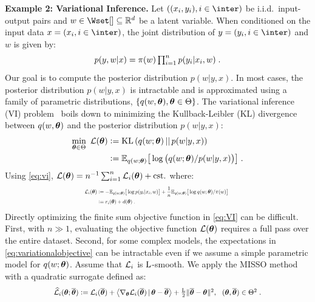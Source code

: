 \documentclass{article}
\newcommand*{\Scale}[2][4]{\scalebox{#1}{$#2$}}%
\begin{document}
\textbf{Example 2: Variational Inference.} 
Let $((x_i,y_i),  i \in \inter)$ be i.i.d.~input-output pairs and $w \in \Wset[] \subseteq \rset^{d}$ be a latent variable. When conditioned on the input data $x = (x_i, i \in \inter)$, the joint distribution of $y = (y_i, i \in \inter)$ and $w$ is given by:
\begin{equation}\label{eq:vi} \textstyle
    p(y,w | x) = \prior(w)\prod_{i=1}^{n}{p(y_i | x_i, w)} \eqsp.
\end{equation}
Our goal is to compute the posterior distribution $p(w|y,x)$.
In most cases, the posterior distribution $p(w|y,x)$ is intractable and is approximated using a family of parametric distributions, $\{q(w, \param ), \param \in \Param \}$. The variational inference (VI) problem~\cite{blei2017vi} boils down to minimizing the Kullback-Leibler (KL) divergence between $q(w, \param )$ and the posterior distribution $p(w|y,x)$:
\begin{equation} \label{eq:VI}  
\begin{split}
\min_{ \param \in \Param }~{\cal L}(\param )& \eqdef \infdiv{q(w; \param )}{p(w|y,x)} \\
&\eqdef \EE_{ q( w; \param )} \big[ \log \big( q(w; \param ) / p(w|y,x) \big) \big] \eqsp.
\end{split}
\end{equation}
Using \eqref{eq:vi}, ${\cal L}(\param) = n^{-1} \sum_{i=1}^{n}{{\cal L}_i(\param)} + {\rm cst}.$ where:
\begin{equation}\label{eq:variationalobjective}
\resizebox{.5\textwidth}{!}{%
$\begin{aligned}
{\cal L}_i(\param) &\eqdef -\EE_{ q( w; \param )} \big[\log p(y_i | x_i, w) \big]+  \frac{1}{n} \EE_{ q( w; \param )} \big[ \log q(w; \param )/\prior(w) \big]\\
& \eqdef r_i(\param) + d(\param) \eqsp.
\end{aligned}$
}
\end{equation}
Directly optimizing the finite sum objective function in \eqref{eq:VI} can be difficult.
First, with $n \gg 1$, evaluating the objective function ${\cal L}( \param )$ requires a full pass over the entire dataset.
Second, for some complex models, the expectations in \eqref{eq:variationalobjective} can be intractable even if we assume a simple parametric model for $q(w; \param)$.
Assume that ${\cal L}_i$ is $\rm L$-smooth.
We apply the MISSO method with a quadratic surrogate defined as:
\begin{equation} \label{eq:quad_sur}
\Scale[0.85]{\sur{i}{\param}{\op} \eqdef {\cal L}_i(\op) + \pscal{ \nabla_{\param} {\cal L}_i(\op)} { \param - \op} +\frac{\rm L}{2}\|\op -\param \|^2 , ~~(\param, \op) \in \Param^2 \eqsp.}
\end{equation}
\end{document}
